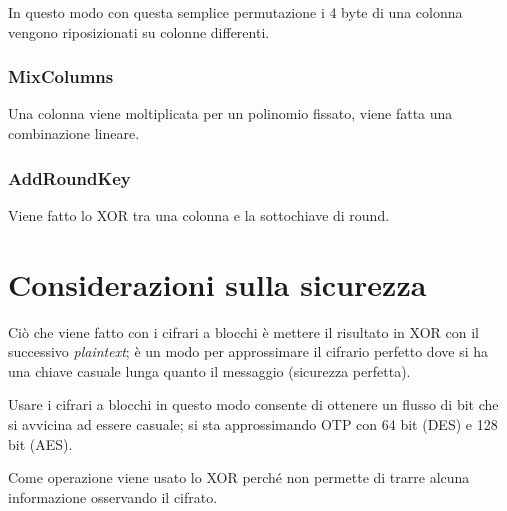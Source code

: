 \noindent In questo modo con questa semplice permutazione i 4 byte di una 
colonna vengono riposizionati su colonne differenti.

\subsubsection{MixColumns}

Una colonna viene moltiplicata per un polinomio fissato, viene fatta una combinazione 
lineare.

\subsubsection{AddRoundKey}

Viene fatto lo XOR tra una colonna e la sottochiave di round.

\section{Considerazioni sulla sicurezza}

Ciò che viene fatto con i cifrari a blocchi è mettere il risultato 
in XOR con il successivo \textit{plaintext}; è un modo per approssimare il 
cifrario perfetto dove si ha una chiave casuale lunga quanto il messaggio (sicurezza 
perfetta).

\noindent Usare i cifrari a blocchi in questo modo consente di ottenere 
un flusso di bit che si avvicina ad essere casuale; si sta approssimando OTP con 
64 bit (DES) e 128 bit (AES).

\noindent Come operazione viene usato lo XOR perché non permette di trarre alcuna 
informazione osservando il cifrato.




